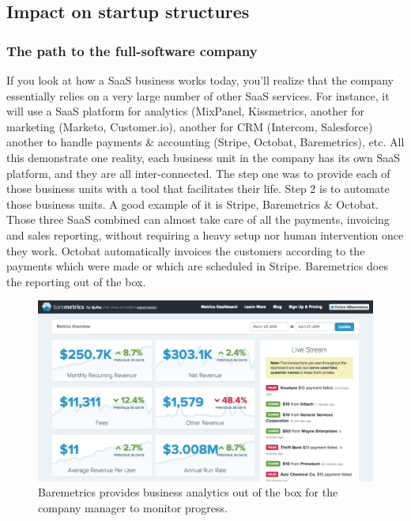 \documentclass[12pt]{article}
\begin{document}
\subsection{Impact on startup structures}

\subsubsection{The path to the full-software company}

If you look at how a SaaS business works today, you'll realize that the company
essentially relies on a very large number of other SaaS services. For instance,
it will use a SaaS platform for analytics (MixPanel, Kissmetrics, another for
marketing (Marketo, Customer.io), another for CRM (Intercom, Salesforce) another
to handle payments \& accounting (Stripe, Octobat, Baremetrics), etc.
All this demonstrate one reality, each business unit in the company has its own
SaaS platform, and they are all inter-connected. The step one was to provide
each of those business units with a tool that facilitates their life. Step 2 is
to automate those business units. A good example of it is Stripe, Baremetrics
\& Octobat. Those three SaaS combined can almost take care of all the payments,
invoicing and sales reporting, without requiring a heavy setup nor human
intervention once they work. Octobat automatically invoices the customers
according to the payments which were made or which are scheduled in Stripe.
Baremetrics does the reporting out of the box.

\begin{figure}[ht]
    \centering
    \includegraphics[width=\textwidth]{baremetrics}
    \caption{Baremetrics provides business analytics out of the box for the
    company manager to monitor progress.}
    \label{fig:baremetrics}
\end{figure}
\end{document}
